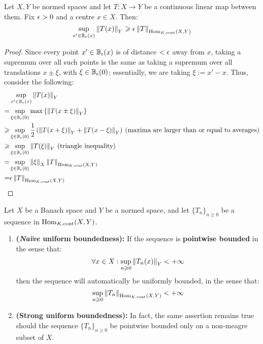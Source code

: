         \begin{lemma} \label{lemma: suprema_of_averages}
            Let $X, Y$ be normed spaces and let $T: X \to Y$ be a continuous linear map between them. Fix $\epsilon > 0$ and a centre $x \in X$. Then:
                $$\sup_{x' \in \mathbb{B}_{\epsilon}(x)} \left\| {T(x)} \right\|_Y \geqslant \epsilon \left\| {T} \right\|_{\mathrm{Hom}_{K, \mathrm{cont}}(X, Y)}$$
        \end{lemma}
            \begin{proof}
                Since every point $x' \in \mathbb{B}_{\epsilon}(x)$ is of distance $< \epsilon$ away from $x$, taking a supremum over all such points is the same as taking a supremum over all translations $x \pm \xi$, with $\xi \in \mathbb{B}_{\epsilon}(0)$; essentially, we are taking $\xi := x' - x$. Thus, consider the following:
                    $$
                        \begin{aligned}
                            & \sup_{x' \in \mathbb{B}_{\epsilon}(x)} \left\| {T(x)} \right\|_Y
                            \\
                            = & \sup_{\xi \in \mathbb{B}_{\epsilon}(0)} \max\left\{ \left\| {T(x \pm \xi)} \right\|_Y \right\}
                            \\
                            \geqslant & \sup_{\xi \in \mathbb{B}_{\epsilon}(0)} \frac12\left( \left\| {T(x + \xi)} \right\|_Y + \left\| {T(x - \xi)} \right\|_Y \right) \: \text{(maxima are larger than or equal to averages)}
                            \\
                            \geqslant & \sup_{\xi \in \mathbb{B}_{\epsilon}(0)} \left\| {T(\xi)} \right\|_Y \: \text{(triangle inequality)}
                            \\
                            = & \sup_{\xi \in \mathbb{B}_{\epsilon}(0)} \left\| {\xi} \right\|_X \left\| {T} \right\|_{\mathrm{Hom}_{K, \mathrm{cont}}(X, Y)}
                            \\
                            = & \epsilon \left\| {T} \right\|_{\mathrm{Hom}_{K, \mathrm{cont}}(X, Y)}
                        \end{aligned}
                    $$
            \end{proof}
        \begin{theorem} \label{theorem: uniform_boundedness}
            Let $X$ be a Banach space and $Y$ be a normed space, and let $\{T_n\}_{n \geq 0}$ be a sequence in $\mathrm{Hom}_{K, \mathrm{cont}}(X, Y)$.
            \begin{enumerate}
                \item \textbf{(\textit{Na\"ive} uniform boundedness):} If the sequence is \textbf{pointwise bounded} in the sense that:
                    $$\forall x \in X: \sup_{n \geqslant 0} \left\| { T_n(x) } \right\|_Y < +\infty$$
                then the sequence will automatically be uniformly bounded, in the sense that:
                    $$\sup_{n \geqslant 0} \left\| {T_n} \right\|_{\mathrm{Hom}_{K, \mathrm{cont}}(X, Y)} < +\infty$$
                \item \textbf{(Strong uniform boundedness):} In fact, the same assertion remains true should the sequence $\{T_n\}_{n \geq 0}$ be pointwise bounded only on a non-meagre subset of $X$. 
            \end{enumerate}
        \end{theorem}
